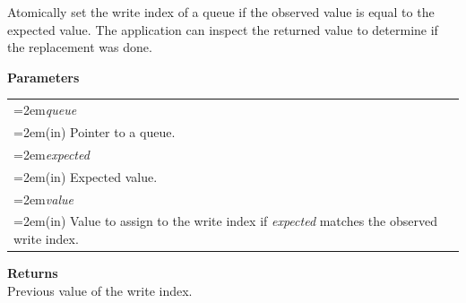 \documentclass[final]{book}
\newcommand{\hsaarg}[1]{\textit{#1}}
\begin{document}
\vspace{-2mm}Atomically set the write index of a queue if the observed value is equal to the expected value. The application can inspect the returned value to determine if the replacement was done.

\noindent\textbf{Parameters}\\[-6mm]
\noindent\begin{longtable}{@{}>{\hangindent=2em}p{\textwidth}}
\hsaarg{queue}\\\hspace{2em}(in) Pointer to a queue.\\[2mm]
\hsaarg{expected}\\\hspace{2em}(in) Expected value.\\[2mm]
\hsaarg{value}\\\hspace{2em}(in) Value to assign to the write index if \textit{expected} matches the observed write index.
\end{longtable}
\vspace{-5mm}\noindent\textbf{Returns}\\[1mm]
Previous value of the write index.

 
\end{document}
